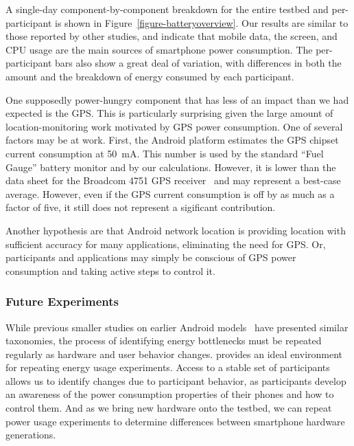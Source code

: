 A single-day component-by-component breakdown for the entire testbed and
per-participant is shown in Figure~\ref{figure-batteryoverview}. Our results
are similar to those reported by other studies, and indicate that mobile
data, the screen, and CPU usage are the main sources of smartphone power
consumption. The per-participant bars also show a great deal of variation,
with differences in both the amount and the breakdown of energy consumed by
each participant.

One supposedly power-hungry component that has less of an impact than we had
expected is the GPS. This is particularly surprising given the large amount
of location-monitoring work motivated by GPS power consumption. One of
several factors may be at work. First, the Android platform estimates the GPS
chipset current consumption at 50~mA. This number is used by the standard
``Fuel Gauge'' battery monitor and by our calculations. However, it is lower
than the data sheet for the Broadcom 4751 GPS receiver~\cite{bcm4751} and may
represent a best-case average. However, even if the GPS current consumption
is off by as much as a factor of five, it still does not represent a
sigificant contribution.

Another hypothesis are that Android network location is providing location
with sufficient accuracy for many applications, eliminating the need for GPS.
Or, participants and applications may simply be conscious of GPS power
consumption and taking active steps to control it.

\subsubsection{Future Experiments}

While previous smaller studies on earlier Android
models~\cite{shye:micro:2009} have presented similar taxonomies, the process
of identifying energy bottlenecks must be repeated regularly as hardware and
user behavior changes. \PhoneLab{} provides an ideal environment for
repeating energy usage experiments. Access to a stable set of participants
allows us to identify changes due to participant behavior, as participants
develop an awareness of the power consumption properties of their phones and
how to control them. And as we bring new hardware onto the testbed, we can
repeat power usage experiments to determine differences between smartphone
hardware generations.
